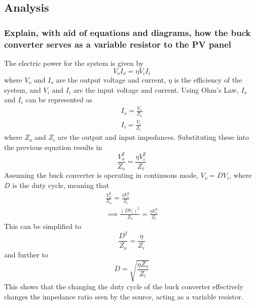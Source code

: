 \documentclass[]{article}
\begin{document}
 		\subsection{Analysis}
 			\subsubsection{Explain, with aid of equations and diagrams, how the buck converter serves as a variable resistor to the PV panel} 			
 				The electric power for the system is given by 				
 				\begin{equation*}
 					V_o I_o = \eta V_i I_i
 				\end{equation*}
 				where $V_o$ and $I_o$ are the output voltage and current, $\eta$ is the efficiency of the system, and $V_i$ and $I_i$ are the input voltage and current. Using Ohm's Law, $I_o$ and $I_i$ can be represented as
 				\begin{align*}
 					I_o = \frac{V_o}{Z_o}\\
 					I_i = \frac{V_i}{Z_i}
 				\end{align*}
 				where $Z_o$ and $Z_i$ are the output and input impedances. Substituting these into the previous equation results in
 				\begin{equation*}
 					\frac{V_o^2}{Z_o}=\frac{\eta V_i^2}{Z_i}
 				\end{equation*}
 				Assuming the buck converter is operating in continuous mode, $V_o = DV_i$, where $D$ is the duty cycle, meaning that
 				\begin{align*}
 					\frac{V_o^2}{Z_o}=\frac{\eta V_i^2}{Z_i}\\
 					\implies\frac{(DV_i)^2}{Z_o}=\frac{\eta V_i^2}{Z_i}
 				\end{align*}
 				This can be simplified to
 				\begin{equation*}
 					\frac{D^2}{Z_o}=\frac{\eta}{Z_i}
 				\end{equation*}
 				and further to
 				\begin{equation*}
 					D = \sqrt{\frac{\eta Z_o}{Z_i}}
 				\end{equation*}
 				This shows that the changing the duty cycle of the buck converter effectively changes the impedance ratio seen by the source, acting as a variable resistor.
 				
\end{document}
